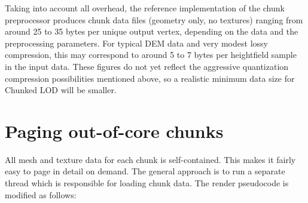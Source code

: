 \documentclass[12pt]{article}
\begin{document}

Taking into account all overhead, the reference implementation of the
chunk preprocessor produces chunk data files (geometry only, no
textures) ranging from around 25 to 35 bytes per unique output vertex,
depending on the data and the preprocessing parameters.  For typical
DEM data and very modest lossy compression, this may correspond to
around 5 to 7 bytes per heightfield sample in the input data.  These
figures do not yet reflect the aggressive quantization compression
possibilities mentioned above, so a realistic minimum data size for
Chunked LOD will be smaller.
 
\section{Paging out-of-core chunks}

All mesh and texture data for each chunk is self-contained.  This
makes it fairly easy to page in detail on demand.  The general
approach is to run a separate thread which is responsible for loading
chunk data.  The render pseudocode is modified as follows:
\end{document}
